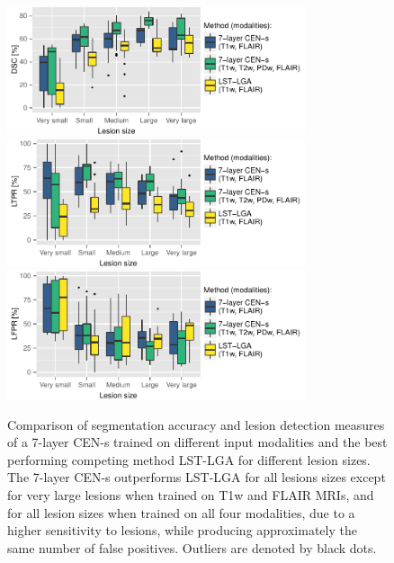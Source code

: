 \begin{figure}
\centering
\includegraphics[width=0.78\textwidth]{figures/tmi/dsc}
\\[1em]
\includegraphics[width=0.78\textwidth]{figures/tmi/tpr}
\\[1em]
\includegraphics[width=0.78\textwidth]{figures/tmi/fpr}

\caption[Comparison of segmentation accuracy and lesion detection measures of a
7-layer CEN-s and LST-LGA for different lesion sizes]{Comparison of segmentation
accuracy and lesion detection measures of a 7-layer CEN-s trained on different
input modalities and the best performing competing method LST-LGA for different
lesion sizes. The 7-layer CEN-s outperforms LST-LGA for all lesions sizes except
for very large lesions when trained on T1w and FLAIR MRIs, and for all lesion
sizes when trained on all four modalities, due to a higher sensitivity to
lesions, while producing approximately the same number of false positives.
Outliers are denoted by black dots.}

\label{fig:sizecomp}
\end{figure}

